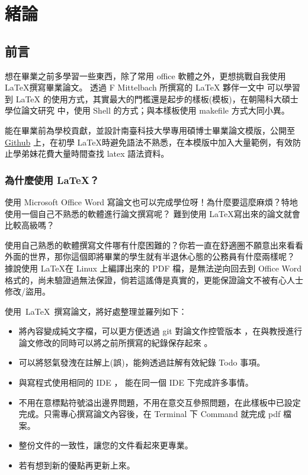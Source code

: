 \chapter{緒論}\label{explanation}


\section{前言}\label{1-1}
想在畢業之前多學習一些東西，除了常用 office 軟體之外，更想挑戰自我使用 \LaTeX 撰寫畢業論文\cite{learn-latex}。
透過 F Mittelbach 所撰寫的 LaTeX 夥伴一文中 \cite{mittelbach2004} 可以學習到 LaTeX\cite{the-latex-project} 的使用方式，其實最大的門檻還是起步的樣板(模板)，在朝陽科大碩士學位論文研究 \cite{ShellLATEX} 中，使用 Shell 的方式；與本樣板使用 makefile 方式大同小異。

能在畢業前為學校貢獻，並設計南臺科技大學專用碩博士畢業論文模版，公開至 \href{https://github.com/tw1chao/STUST-thesis-template}{Github} 上，在初學 \LaTeX 時避免語法不熟悉，在本模版中加入大量範例，有效防止學弟妹花費大量時間查找 latex 語法資料。

\subsection{為什麼使用 LaTeX？}
使用 Microsoft Office Word 寫論文也可以完成學位呀！為什麼要這麼麻煩？特地使用一個自己不熟悉的軟體進行論文撰寫呢？
難到使用 \LaTeX 寫出來的論文就會比較高級嗎？

使用自己熟悉的軟體撰寫文件哪有什麼困難的？你若一直在舒適圈不願意出來看看外面的世界，那你這個即將畢業的學生就有半退休心態的公務員有什麼兩樣呢？
據說使用 \LaTeX 在 Linux 上編譯出來的 PDF 檔，是無法逆向回去到 Office Word 格式的，尚未驗證過無法保證，倘若這謠傳是真實的，更能保證論文不被有心人士修改/盜用。

\clearpage

\hbox{使用 LaTeX 撰寫論文，將好處整理並羅列如下：}

\begin{itemize}
\item 將內容變成純文字檔，可以更方便透過 git \cite{git-version-control} \cite{git20190914} 對論文作控管版本 \cite{spinellis2012git}，在與教授進行論文修改的同時可以將之前所撰寫的紀錄保存起來 \cite{chacon2014pro}。
\item 可以將怒氣發洩在註解上(誤)，能夠透過註解有效紀錄 Todo 事項。
\item 與寫程式使用相同的 IDE ， 能在同一個 IDE 下完成許多事情。
\item 不用在意標點符號溢出邊界問題，不用在意交互參照問題，在此樣板中已設定完成。只需專心撰寫論文內容後，在 Terminal 下 Command 就完成 pdf 檔案。
\item 整份文件的一致性，讓您的文件看起來更專業。
\item 若有想到新的優點再更新上來。
\end{itemize}

